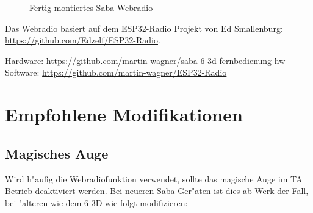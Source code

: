 \documentclass[ngerman,11pt,parskip=half] {scrartcl}
\begin{document}
\begin{figure}[H]
\centering
{}
\caption{Fertig montiertes Saba Webradio} \label{fig:1}
\end{figure}

Das Webradio basiert auf dem ESP32-Radio Projekt von Ed Smallenburg: \url{https://github.com/Edzelf/ESP32-Radio}.

Hardware: \url{https://github.com/martin-wagner/saba-6-3d-fernbedienung-hw}\\
Software: \url{https://github.com/martin-wagner/ESP32-Radio}


\section{Empfohlene Modifikationen} \label{sec:mod}

\subsection{Magisches Auge} \label{sec:mod:magischesauge}

Wird h"aufig die Webradiofunktion verwendet, sollte das magische Auge im TA Betrieb deaktiviert werden. Bei neueren Saba Ger"aten ist dies ab Werk der Fall, bei "alteren wie dem 6-3D wie folgt modifizieren:
\end{document}
